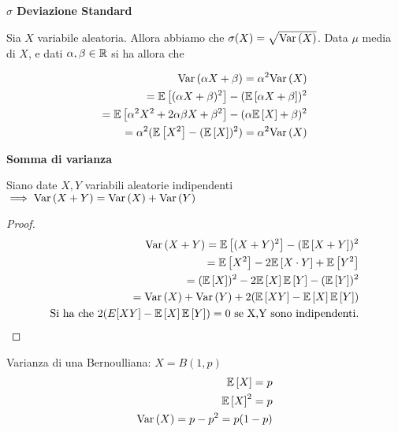 \begin{defn}
	\textbf{$\sigma$ Deviazione Standard}
	
	Sia $ X $ variabile aleatoria. Allora abbiamo che $ \sigma(X) = \sqrt{\text{Var}\left(X\right)} $. Data $ \mu $ media di $ X $, e dati $ \alpha, \beta \in \mathbb{R} $ si ha allora che
	
	\begin{equation*}
		\begin{aligned}
			\text{Var}\left(\alpha X + \beta\right) = \alpha ^2 \text{Var}\left(X\right) \\
			= \mathbb{E}\left[(\alpha X + \beta)^2\right] - (\mathbb{E}\left[\alpha X + \beta\right])^2 \\
			= \mathbb{E}\left[\alpha^2 X^2 + 2 \alpha \beta X + \beta^2\right] - (\alpha \mathbb{E}\left[X\right] + \beta)^2 \\
			= \alpha^2 (\mathbb{E}\left[X^2\right] - (\mathbb{E}\left[X\right])^2) = \alpha^2 \text{Var}\left(X\right)
		\end{aligned}
	\end{equation*}
\end{defn}


\begin{defn}
	\textbf{Somma di varianza} 
	
	Siano date $ X,Y $ variabili aleatorie indipendenti $ \implies \text{Var}\left(X + Y\right) = \text{Var}\left(X\right) + \text{Var}\left(Y\right) $ 
	
	\begin{proof}
		\begin{equation*}
		\begin{aligned}
		\text{Var}\left(X+Y\right) = \mathbb{E}\left[(X+Y)^2\right] - (\mathbb{E}\left[X+Y\right])^2 \\
		= \mathbb{E}\left[X^2\right] - 2\mathbb{E}\left[X \cdot Y\right] + \mathbb{E}\left[Y^2\right] \\ 
		= (\mathbb{E}\left[X\right])^2 - 2\mathbb{E}\left[X\right]\mathbb{E}\left[Y\right] - (\mathbb{E}\left[Y\right])^2 \\
		= \text{Var}\left(X\right) + \text{Var}\left(Y\right) + 2(\mathbb{E}\left[XY\right] - \mathbb{E}\left[X\right]\mathbb{E}\left[Y\right])\\
		\text{Si ha che } 2(E[XY] - \mathbb{E}\left[X\right]\mathbb{E}\left[Y\right]) = 0 \text{ se X,Y sono indipendenti.}
		\end{aligned}
		\end{equation*}
	\end{proof}
	
\end{defn}


\begin{defn}
	Varianza di una Bernoulliana: $ X = B(1,p) $
	\begin{equation*}
	\begin{aligned}
		\mathbb{E}\left[X\right] = p \\
		\mathbb{E}\left[X\right]^2 = p \\
		\text{Var}\left(X\right) = p-p^2 = p(1-p)
	\end{aligned}
	\end{equation*}
\end{defn}

